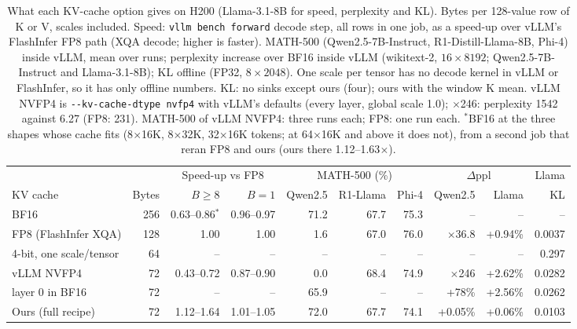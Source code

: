 \providecommand{\pend}{\textcolor{gray}{pend.}}
\begin{table}[tbp]
\centering
\caption{What each KV-cache option gives on H200 (Llama-3.1-8B for speed, perplexity and KL). Bytes per 128-value
row of K or V, scales included. Speed: \texttt{vllm bench forward} decode step, all rows in one job, as a speed-up
over vLLM's FlashInfer FP8 path (XQA decode; higher is faster). MATH-500 (Qwen2.5-7B-Instruct, R1-Distill-Llama-8B, Phi-4) inside vLLM, mean over runs; perplexity increase over BF16 inside vLLM
(wikitext-2, $16\times8192$; Qwen2.5-7B-Instruct and Llama-3.1-8B); KL offline (FP32, $8\times2048$). One scale per tensor has no decode kernel in vLLM or
FlashInfer, so it has only offline numbers. KL: no sinks except ours (four); ours with the window K mean. vLLM NVFP4 is \texttt{-{}-kv-cache-dtype nvfp4} with vLLM's defaults
(every layer, global scale 1.0); $\times$246: perplexity 1542 against 6.27 (FP8: 231). MATH-500 of vLLM NVFP4: three runs each; FP8: one run each. $^*$BF16 at the three shapes whose cache fits (8$\times$16K, 8$\times$32K, 32$\times$16K tokens; at 64$\times$16K and above it does not), from a second job that reran FP8 and ours (ours there 1.12--1.63$\times$).}
\label{tab:baselines}
\small\setlength{\tabcolsep}{2.9pt}
\begin{tabular}{@{}lrrrrrrrrr@{}}
\toprule
& & \multicolumn{2}{c}{Speed-up vs FP8} & \multicolumn{3}{c}{MATH-500 (\%)} & \multicolumn{2}{c}{$\Delta$ppl} & Llama \\
\cmidrule(lr){3-4}\cmidrule(lr){5-7}\cmidrule(lr){8-9}
KV cache & Bytes & $B\geq8$ & $B=1$ & Qwen2.5 & R1-Llama & Phi-4 & Qwen2.5 & Llama & KL \\
\midrule
BF16                                & 256 & 0.63--0.86$^*$ & 0.96--0.97 & 71.2 & 67.7 & 75.3 & -- & -- & -- \\
FP8 (FlashInfer XQA)                & 128 & 1.00  & 1.00  & 1.6 & 67.0 & 76.0 & $\times$36.8 & +0.94\% & 0.0037 \\
4-bit, one scale/tensor & 64 & -- & -- & -- & -- & -- & -- & -- & 0.297 \\
vLLM NVFP4                          & 72  & 0.43--0.72 & 0.87--0.90 & 0.0 & 68.4 & 74.9 & $\times$246 & +2.62\% & 0.0282 \\
\quad layer 0 in BF16            & 72  & --    & --    & 65.9 & --    & --    & +78\% & +2.56\% & 0.0262 \\
Ours (full recipe)                  & 72  & 1.12--1.64 & 1.01--1.05 & 72.0 & 67.7 & 74.1 & +0.05\% & +0.06\% & 0.0103 \\
\bottomrule
\end{tabular}
\end{table}


